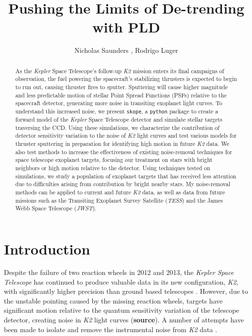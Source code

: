 \documentclass[12pt,preprint]{aastex}
\begin{document}
\title{Pushing the Limits of De-trending with PLD}


\author{Nicholas Saunders , Rodrigo Luger }


\begin{abstract}

	As the \textit{Kepler} Space Telescope's follow-up \textit{K2} mission enters its final campaigns of observation, the fuel powering the spacecraft's stabilizing thrusters is expected to begin to run out, causing thruster fires to sputter. Sputtering will cause higher magnitude and less predictable motion of stellar Point Spread Functions (PSFs) relative to the spacecraft detector, generating more noise in transiting exoplanet light curves. To understand this increased noise, we present \texttt{skope}, a \texttt{python} package to create a forward model of the \textit{Kepler} Space Telescope detector and simulate stellar targets traversing the CCD. Using these simulations, we characterize the contribution of detector sensitivity variation to the noise of \textit{K2} light curves and test various models for thruster sputtering in preparation for identifying high motion in future \textit{K2} data. We also test methods to increase the effectiveness of existing noise-removal techniques for space telescope exoplanet targets, focusing our treatment on stars with bright neighbors or high motion relative to the detector. Using techniques tested on simulations, we study a population of exoplanet targets that has received less attention due to difficulties arising from contribution by bright nearby stars. My noise-removal methods can be applied to current and future \textit{K2} data, as well as data from future missions such as the Transiting Exoplanet Survey Satellite (\textit{TESS}) and the James Webb Space Telescope (\textit{JWST}).

\end{abstract}

\section{Introduction}

Despite the failure of two reaction wheels in 2012 and 2013, the \textit{Kepler Space Telescope} has continued to produce valuable data in its new configuration, \textit{K2}, with significantly higher precision than ground based telescopes \citep{2014PASP..126..398H}. However, due to the unstable pointing caused by the missing reaction wheels, targets have significant motion relative to the quantum sensitivity variation of the telescope detector, creating noise in \textit{K2} light curves (\textbf{source}). A number of attempts have been made to isolate and remove the instrumental noise from \textit{K2} data \citep{2015A&A...579A..19A, 0004-637X-806-1-30, 2015MNRAS.454.4159H, 2015MNRAS.447.2880A, 2016MNRAS.459.2408A}.
\end{document}
